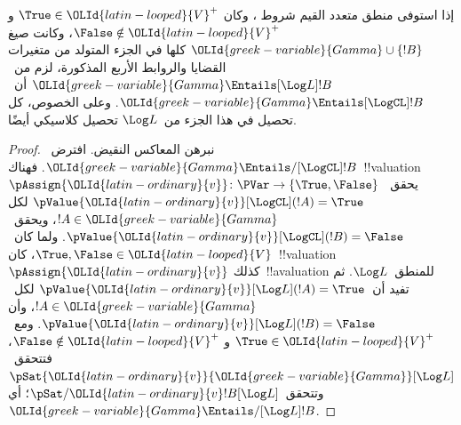 \documentclass[../../../include/open-logic-section]{subfiles}
\begin{document}
\begin{cor}
  إذا استوفى منطق متعدد القيم شروط ، وكان
  $\True \in {\OLId{latin-looped}{V}}^+$ و$\False \notin {\OLId{latin-looped}{V}}^+$، وكانت صيغ
  ${\OLId{greek-variable}{Gamma}} \cup \{!B\}$ كلها في الجزء المتولد من متغيرات القضايا
  والروابط الأربع المذكورة، لزم من~${\OLId{greek-variable}{Gamma}} \Entails[\Log L] !B$
  أن~${\OLId{greek-variable}{Gamma}} \Entails[\LogCL] !B$. وعلى الخصوص، كل تحصيل في هذا
  الجزء من~$\Log L$ تحصيل كلاسيكي أيضًا.
\end{cor}

\begin{proof}
  نبرهن المعاكس النقيض. افترض~${\OLId{greek-variable}{Gamma}} \Entails/[\LogCL] !B$.
  فهناك~!!{valuation}~$\pAssign {\OLId{latin-ordinary}{v}}\colon \PVar \to
  \{\True, \False\}$ يحقق~$\pValue {\OLId{latin-ordinary}{v}}[\LogCL](!A) = \True$ لكل
  $!A \in {\OLId{greek-variable}{Gamma}}$، ويحقق~$\pValue {\OLId{latin-ordinary}{v}}[\LogCL](!B) = \False$.
  ولما كان~$\True, \False \in {\OLId{latin-looped}{V}}$، كان~!!{valuation}~$\pAssign {\OLId{latin-ordinary}{v}}$
  كذلك~!!a{valuation} للمنطق~$\Log L$. ثم تفيد 
  أن~$\pValue {\OLId{latin-ordinary}{v}}[\Log L](!A) = \True$ لكل~$!A \in {\OLId{greek-variable}{Gamma}}$، وأن
  $\pValue {\OLId{latin-ordinary}{v}}[\Log L](!B) = \False$. ومع~$\True \in {\OLId{latin-looped}{V}}^+$ و
  $\False \notin {\OLId{latin-looped}{V}}^+$، فتتحقق~$\pSat{{\OLId{latin-ordinary}{v}}}{{\OLId{greek-variable}{Gamma}}}[\Log L]$
  وتتحقق~$\pSat/{{\OLId{latin-ordinary}{v}}}{!B}[\Log L]$؛ أي
  ${\OLId{greek-variable}{Gamma}} \Entails/[\Log L] !B$.
\end{proof}
\end{document}
